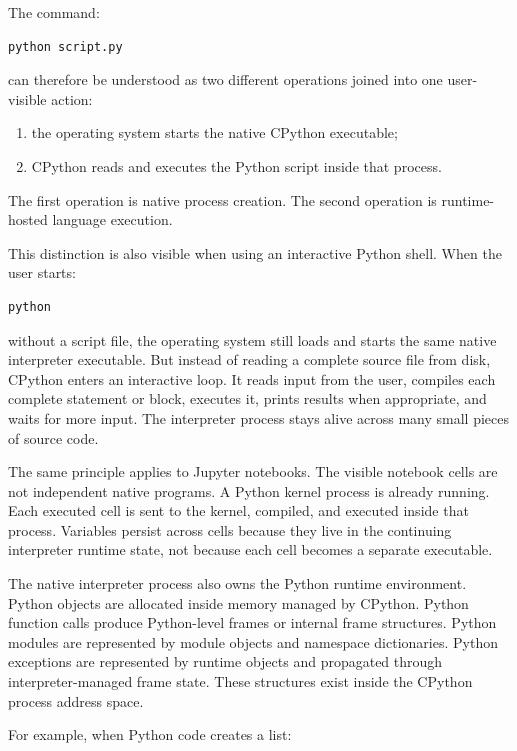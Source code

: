\documentclass[a4paper,twoside]{report}
\begin{document}
The command:

\begin{verbatim}
python script.py
\end{verbatim}

can therefore be understood as two different operations joined into one user-visible action:

\begin{enumerate}
    \item the operating system starts the native CPython executable;
    \item CPython reads and executes the Python script inside that process.
\end{enumerate}

The first operation is native process creation. The second operation is runtime-hosted language execution.

This distinction is also visible when using an interactive Python shell. When the user starts:

\begin{verbatim}
python
\end{verbatim}

without a script file, the operating system still loads and starts the same native interpreter executable. But instead of reading a complete source file from disk, CPython enters an interactive loop. It reads input from the user, compiles each complete statement or block, executes it, prints results when appropriate, and waits for more input. The interpreter process stays alive across many small pieces of source code.

The same principle applies to Jupyter notebooks. The visible notebook cells are not independent native programs. A Python kernel process is already running. Each executed cell is sent to the kernel, compiled, and executed inside that process. Variables persist across cells because they live in the continuing interpreter runtime state, not because each cell becomes a separate executable.

The native interpreter process also owns the Python runtime environment. Python objects are allocated inside memory managed by CPython. Python function calls produce Python-level frames or internal frame structures. Python modules are represented by module objects and namespace dictionaries. Python exceptions are represented by runtime objects and propagated through interpreter-managed frame state. These structures exist inside the CPython process address space.

For example, when Python code creates a list:
\end{document}
